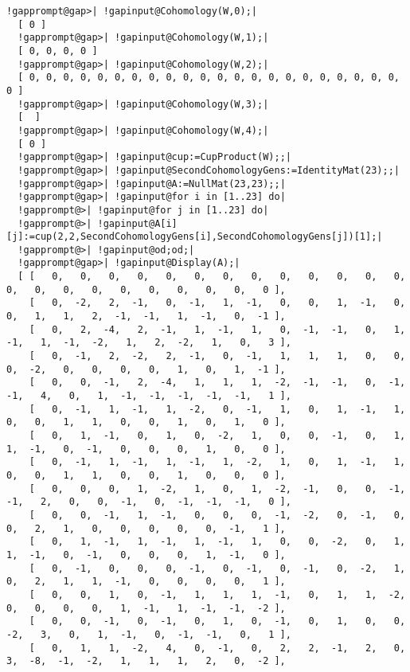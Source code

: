 \documentclass[a4paper,11pt]{report}
\begin{document}
{{\begin{Verbatim}[commandchars=!@|,fontsize=\small,frame=single,label=Example]
  !gapprompt@gap>| !gapinput@Cohomology(W,0);|
  [ 0 ]
  !gapprompt@gap>| !gapinput@Cohomology(W,1);|
  [ 0, 0, 0, 0 ]
  !gapprompt@gap>| !gapinput@Cohomology(W,2);|
  [ 0, 0, 0, 0, 0, 0, 0, 0, 0, 0, 0, 0, 0, 0, 0, 0, 0, 0, 0, 0, 0, 0, 0 ]
  !gapprompt@gap>| !gapinput@Cohomology(W,3);|
  [  ]
  !gapprompt@gap>| !gapinput@Cohomology(W,4);|
  [ 0 ]
  !gapprompt@gap>| !gapinput@cup:=CupProduct(W);;|
  !gapprompt@gap>| !gapinput@SecondCohomologyGens:=IdentityMat(23);;|
  !gapprompt@gap>| !gapinput@A:=NullMat(23,23);;|
  !gapprompt@gap>| !gapinput@for i in [1..23] do|
  !gapprompt@>| !gapinput@for j in [1..23] do|
  !gapprompt@>| !gapinput@A[i][j]:=cup(2,2,SecondCohomologyGens[i],SecondCohomologyGens[j])[1];|
  !gapprompt@>| !gapinput@od;od;|
  !gapprompt@gap>| !gapinput@Display(A);|
  [ [   0,   0,   0,   0,   0,   0,   0,   0,   0,   0,   0,   0,   0,   0,   0,   0,   0,   0,   0,   0,   0,   0,   0 ],
    [   0,  -2,   2,  -1,   0,  -1,   1,  -1,   0,   0,   1,  -1,   0,   0,   1,   1,   2,  -1,  -1,   1,  -1,   0,  -1 ],
    [   0,   2,  -4,   2,  -1,   1,  -1,   1,   0,  -1,  -1,   0,   1,  -1,   1,  -1,  -2,   1,   2,  -2,   1,   0,   3 ],
    [   0,  -1,   2,  -2,   2,  -1,   0,  -1,   1,   1,   1,   0,   0,   0,  -2,   0,   0,   0,   0,   1,   0,   1,  -1 ],
    [   0,   0,  -1,   2,  -4,   1,   1,   1,  -2,  -1,  -1,   0,  -1,  -1,   4,   0,   1,  -1,  -1,  -1,  -1,  -1,   1 ],
    [   0,  -1,   1,  -1,   1,  -2,   0,  -1,   1,   0,   1,  -1,   1,   0,   0,   1,   1,   0,   0,   1,   0,   1,   0 ],
    [   0,   1,  -1,   0,   1,   0,  -2,   1,   0,   0,  -1,   0,   1,   1,  -1,   0,  -1,   0,   0,   0,   1,   0,   0 ],
    [   0,  -1,   1,  -1,   1,  -1,   1,  -2,   1,   0,   1,  -1,   1,   0,   0,   1,   1,   0,   0,   1,   0,   0,   0 ],
    [   0,   0,   0,   1,  -2,   1,   0,   1,  -2,  -1,   0,   0,  -1,  -1,   2,   0,   0,  -1,   0,  -1,  -1,  -1,   0 ],
    [   0,   0,  -1,   1,  -1,   0,   0,   0,  -1,  -2,   0,  -1,   0,   0,   2,   1,   0,   0,   0,   0,   0,  -1,   1 ],
    [   0,   1,  -1,   1,  -1,   1,  -1,   1,   0,   0,  -2,   0,   1,   1,  -1,   0,  -1,   0,   0,   0,   1,  -1,   0 ],
    [   0,  -1,   0,   0,   0,  -1,   0,  -1,   0,  -1,   0,  -2,   1,   0,   2,   1,   1,  -1,   0,   0,   0,   0,   1 ],
    [   0,   0,   1,   0,  -1,   1,   1,   1,  -1,   0,   1,   1,  -2,   0,   0,   0,   0,   1,  -1,   1,  -1,  -1,  -2 ],
    [   0,   0,  -1,   0,  -1,   0,   1,   0,  -1,   0,   1,   0,   0,  -2,   3,   0,   1,  -1,   0,  -1,  -1,   0,   1 ],
    [   0,   1,   1,  -2,   4,   0,  -1,   0,   2,   2,  -1,   2,   0,   3,  -8,  -1,  -2,   1,   1,   1,   2,   0,  -2 ],

\end{Verbatim}}}
\end{document}
